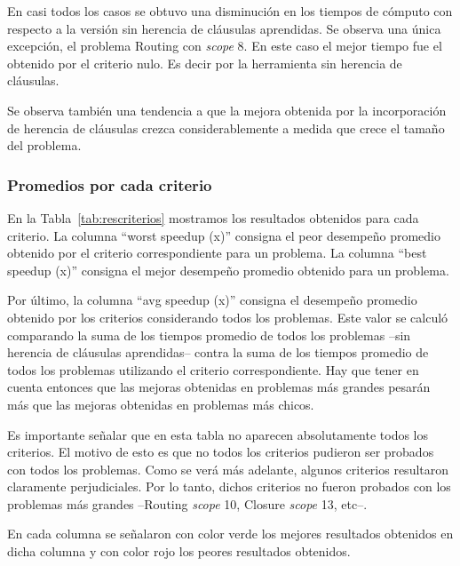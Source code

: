 En casi todos los casos se obtuvo una disminución en los tiempos de cómputo
con respecto a la versión sin herencia de cláusulas aprendidas. Se observa una
única excepción, el problema Routing con \emph{scope} 8. En este caso el mejor
tiempo fue el obtenido por el criterio nulo. Es decir por la herramienta sin
herencia de cláusulas.

Se observa también una tendencia a que la mejora obtenida por la incorporación
de herencia de cláusulas crezca considerablemente a medida que crece el tamaño
del problema.

\subsubsection{Promedios por cada criterio}

En la Tabla~\ref{tab:rescriterios} mostramos los resultados obtenidos para
cada criterio. La columna ``worst speedup (x)'' consigna el peor desempeño
promedio obtenido por el criterio correspondiente para un problema. La columna
``best speedup (x)'' consigna el mejor desempeño promedio obtenido para un
problema.

Por último, la columna ``avg speedup (x)'' consigna el desempeño promedio
obtenido por los criterios considerando todos los problemas. Este valor se
calculó comparando la suma de los tiempos promedio de todos los problemas
--sin herencia de cláusulas aprendidas-- contra la suma de los tiempos
promedio de todos los problemas utilizando el criterio correspondiente. Hay
que tener en cuenta entonces que las mejoras obtenidas en problemas más
grandes pesarán más que las mejoras obtenidas en problemas más chicos.

Es importante señalar que en esta tabla no aparecen absolutamente todos los
criterios. El motivo de esto es que no todos los criterios pudieron ser
probados con todos los problemas. Como se verá más adelante, algunos criterios
resultaron claramente perjudiciales. Por lo tanto, dichos criterios no fueron
probados con los problemas más grandes --Routing \emph{scope} 10, Closure
\emph{scope} 13, etc--.

En cada columna se señalaron con color verde los mejores resultados obtenidos
en dicha columna y con color rojo los peores resultados obtenidos.

